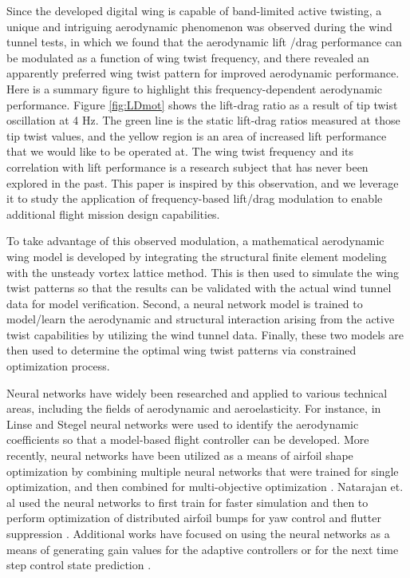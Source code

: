 \documentclass[11pt]{ucthesis}
\begin{document}
Since the developed digital wing is capable of band-limited active twisting, a unique and intriguing aerodynamic phenomenon was observed during the wind tunnel tests, in which we found that the aerodynamic lift /drag performance can be modulated as a function of wing twist frequency, and there revealed an apparently preferred wing twist pattern for improved aerodynamic performance. Here is a summary figure to highlight this frequency-dependent aerodynamic performance. Figure \ref{fig:LDmot} shows the lift-drag ratio as a result of tip twist oscillation at 4 Hz. The green line is the static lift-drag ratios measured at those tip twist values, and the yellow region is an area of increased lift performance that we would like to be operated at. The wing twist frequency and its correlation with lift performance is a research subject that has never been explored in the past. This paper is inspired by this observation, and we leverage it to study the application of frequency-based lift/drag modulation to enable additional flight mission design capabilities. 

To take advantage of this observed modulation, a mathematical aerodynamic wing model is developed by integrating the structural finite element modeling with the unsteady vortex lattice method. This is then used to simulate the wing twist patterns so that the results can be validated with the actual wind tunnel data for model verification. Second, a neural network model is trained to model/learn the aerodynamic and structural interaction arising from the active twist capabilities by utilizing the wind tunnel data. Finally, these two models are then used to determine the optimal wing twist patterns via constrained optimization process.

Neural networks have widely been researched and applied to various technical areas, including the fields of aerodynamic and aeroelasticity. For instance, in Linse and Stegel \cite{linse1993identification} neural networks were used to identify the aerodynamic coefficients so that a model-based flight controller can be developed. More recently, neural networks have been utilized as a means of airfoil shape optimization by combining multiple neural networks that were trained for single optimization, and then combined for multi-objective optimization \cite{rai2000improving,rai2002towards,rai2000aerodynamic}. Natarajan et. al \cite{natarajan2004aeroelastic, natarajan2002dynamic} used the neural networks to first train for faster simulation and then to perform optimization of distributed airfoil bumps for yaw control \cite{natarajan2004aeroelastic} and flutter suppression \cite{natarajan2002dynamic}. Additional works have focused on using the neural networks as a means of generating gain values for the adaptive controllers \cite{lakshmikanth2014adaptive} or for the next time step control state prediction \cite{wang2004time}.
\end{document}
